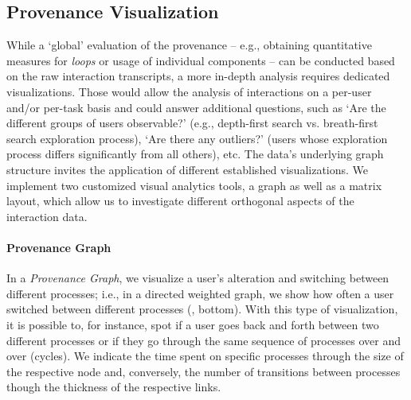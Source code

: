 \subsection{Provenance Visualization} \label{sec:provenance-visualization}


While a `global' evaluation of the provenance -- e.g., obtaining quantitative measures for \emph{loops} or usage of individual components -- can be conducted based on the raw interaction transcripts, a more in-depth analysis requires dedicated visualizations.
%
Those would allow the analysis of interactions on a per-user and/or per-task basis and could answer additional questions, such as
`Are the different groups of users observable?' (e.g., depth-first search vs. breath-first search exploration process), `Are there any outliers?' (users whose exploration process differs significantly from all others), etc.
%
The data's underlying graph structure invites the application of different established visualizations. 
%
We implement two customized visual analytics tools, a graph as well as a matrix layout, which allow us to investigate different orthogonal aspects of the interaction data.



\paragraph*{Provenance Graph}
In a \emph{Provenance Graph}, we visualize a user's alteration and switching between different processes; i.e., in a directed weighted graph, we show how often a user switched between different processes (, bottom). 
%
With this type of visualization, it is possible to, for instance, spot if a user goes back and forth between two different processes or if they go through the same sequence of processes over and over (cycles). 
%
We indicate the time spent on specific processes through the size of the respective node and, conversely, the number of transitions between processes though the thickness of the respective links.


